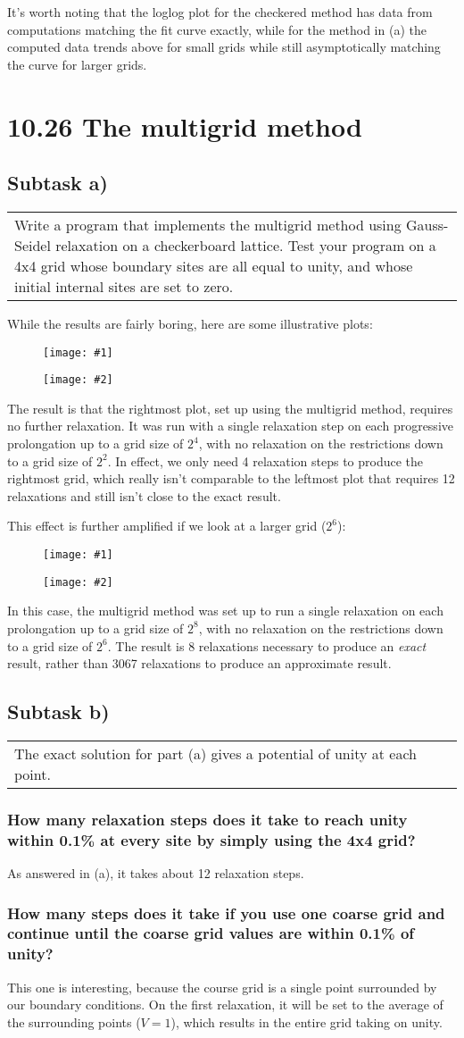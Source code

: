 \documentclass[11pt]{article}
\newcommand{\doublefigure}[2]{
\begin{figure}[H]
  \centering
  \begin{minipage}{0.4\textwidth}
    \centering
    \texttt{[image: \#1]}
  \end{minipage}
  \begin{minipage}{0.4\textwidth}
    \centering
    \texttt{[image: \#2]}
  \end{minipage}
\end{figure}
}
\newcommand{\task}[2]{
  \subsection*{Subtask #1)}
  \begin{tabular}{|p{0.9\textwidth}}
    #2\\
  \end{tabular}
}
\newcommand{\subtask}[1]{
  \subsubsection*{#1}
}
\begin{document}
It's worth noting that the loglog plot for the checkered method has data from computations matching the fit curve exactly,
while for the method in (a) the computed data trends above for small grids while still asymptotically matching the curve for larger grids.

\section*{10.26 The multigrid method}
\task{a}{
  Write a program that implements the multigrid method using Gauss-Seidel relaxation on a checkerboard lattice. 
  Test your program on a 4x4 grid whose boundary sites are all equal to unity, and whose initial internal sites are set to zero.
}
\break
\break
While the results are fairly boring, here are some illustrative plots:
\doublefigure{./plots/1026/a_baseline_1.png}{./plots/1026/a_multigrid_1.png}
The result is that the rightmost plot, set up using the multigrid method, requires no further relaxation.
It was run with a single relaxation step on each progressive prolongation up to a grid size of $2^4$, with no relaxation on the restrictions down to a grid size of $2^2$.
In effect, we only need 4 relaxation steps to produce the rightmost grid,
which really isn't comparable to the leftmost plot that requires 12 relaxations and still isn't close to the exact result.

This effect is further amplified if we look at a larger grid ($2^6$):
\doublefigure{./plots/1026/a_baseline_1_2.png}{./plots/1026/a_multigrid_1_2.png}
In this case, the multigrid method was set up to run a single relaxation on each prolongation up to a grid size of $2^8$, with no relaxation on the restrictions down to a grid size of $2^6$.
The result is 8 relaxations necessary to produce an \textit{exact} result, rather than 3067 relaxations to produce an approximate result.

\task{b}{
  The exact solution for part (a) gives a potential of unity at each point.
}
\subtask{How many relaxation steps does it take to reach unity within 0.1\% at every site by simply using the 4x4 grid?}
As answered in (a), it takes about 12 relaxation steps.
\subtask{How many steps does it take if you use one coarse grid and continue until the coarse grid values are within 0.1\% of unity?}
This one is interesting, because the course grid is a single point surrounded by our boundary conditions.
On the first relaxation, it will be set to the average of the surrounding points ($V=1$), which results in the entire grid taking on unity.
\end{document}
